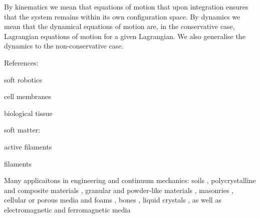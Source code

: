 By kinematics we mean that equations of motion that upon integration ensures that the system remains within its own configuration space. By dynamics we mean that the dynamical equations of motion are, in the conservative case, Lagrangian equations of motion for a given Lagrangian. We also generalise the dynamics to the non-conservative case.



References:

soft robotics \citep{rendaDiscreteCosseratApproach2018, graziosoGeometricallyExactModel2019, rendaDiscreteCosseratApproach2016, caasenbroodEnergyShapingControllersSoft2022, boyerMacrocontinuousComputedTorque2006, boyerMacrocontinuousDynamicsHyperredundant2012, rendaDynamicModelMultibending2014, verlSoftRoboticsTransferring2015, naughtonElasticaCompliantMechanics2021}

cell membranes \citep{krishnaswamyCosserattypeModelRed1996a, rangamaniSmallScaleMembrane2014}

biological tissue \citep{sackBiologicalTissueMechanics2016, zhangModelingSimulationComplex2019}

soft matter:

active filaments \citep{laskarBrownianMicrohydrodynamicsActive2015, laskarFilamentActuationActive2017, kaczmarskiActiveFilamentsCurvature2022, pandeyFlowinducedNonequilibriumSelfassembly2016}

filaments \citep{gazzolaForwardInverseProblems, goldsteinFrontProgagationPearling1996, goldsteinViscousNonlinearDynamics1998, goldsteinNonlinearDynamicsStiff1995}



Many applicaitons in engineering and continuum mechanics:
 soils \citep{stefanouCosseratApproachLocalization2017}, polycrystalline \citep{forestCosseratModellingSize2000} and composite materials \citep{altenbachCosseratMedia2013}, granular and powder-like materials \citep{ebrahimianNumericalStudyInterface2021, mohanFrictionalCosseratModel1999, koteraCosseratContinuumTheory2000}, masonries \citep{stefanouThreedimensionalCosseratHomogenization2008}, cellular \citep{onckCosseratModelingCellular2002} or porous media and foams \citep{iesanDeformationPorousCosserat2011}, bones \citep{parkCosseratMicromechanicsHuman1986}, liquid
crystals \citep{epsteinContinuousDistributionsInhomogeneities2001, gorielyRodTheoryLiquid2022}, as well as electromagnetic and ferromagnetic media \citep{ivanovaNewTheoryCosserat2022, pariaUnifiedTheoryMechanics1978, ivanovaModelingPhysicalFields}


